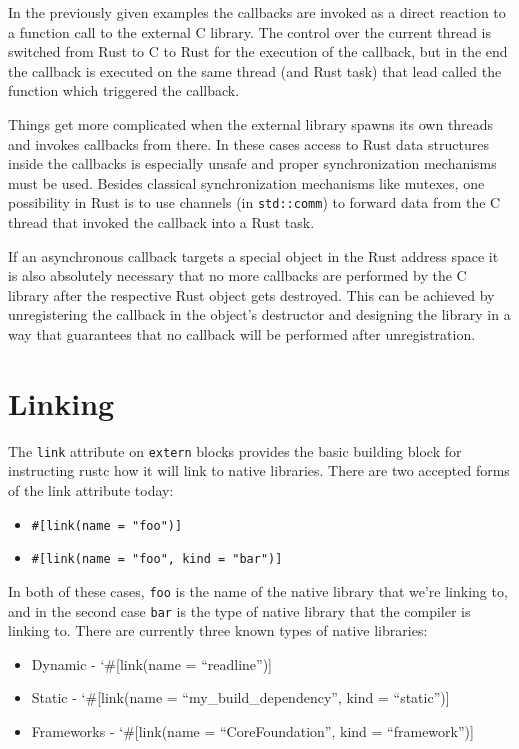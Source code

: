 \documentclass[]{article}
\begin{document}
In the previously given examples the callbacks are invoked as a direct
reaction to a function call to the external C library. The control over
the current thread is switched from Rust to C to Rust for the execution
of the callback, but in the end the callback is executed on the same
thread (and Rust task) that lead called the function which triggered the
callback.

Things get more complicated when the external library spawns its own
threads and invokes callbacks from there. In these cases access to Rust
data structures inside the callbacks is especially unsafe and proper
synchronization mechanisms must be used. Besides classical
synchronization mechanisms like mutexes, one possibility in Rust is to
use channels (in \texttt{std::comm}) to forward data from the C thread
that invoked the callback into a Rust task.

If an asynchronous callback targets a special object in the Rust address
space it is also absolutely necessary that no more callbacks are
performed by the C library after the respective Rust object gets
destroyed. This can be achieved by unregistering the callback in the
object's destructor and designing the library in a way that guarantees
that no callback will be performed after unregistration.

\section{Linking}\label{linking}

The \texttt{link} attribute on \texttt{extern} blocks provides the basic
building block for instructing rustc how it will link to native
libraries. There are two accepted forms of the link attribute today:

\begin{itemize}
\itemsep1pt\parskip0pt
\item
  \texttt{\#{[}link(name = "foo"){]}}
\item
  \texttt{\#{[}link(name = "foo", kind = "bar"){]}}
\end{itemize}

In both of these cases, \texttt{foo} is the name of the native library
that we're linking to, and in the second case \texttt{bar} is the type
of native library that the compiler is linking to. There are currently
three known types of native libraries:

\begin{itemize}
\itemsep1pt\parskip0pt
\item
  Dynamic - `\#{[}link(name = ``readline''){]}
\item
  Static - `\#{[}link(name = ``my\_build\_dependency'', kind =
  ``static''){]}
\item
  Frameworks - `\#{[}link(name = ``CoreFoundation'', kind =
  ``framework''){]}
\end{itemize}
\end{document}

